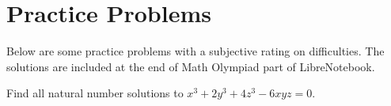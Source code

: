 \documentclass[../../main.tex]{subfiles}
\begin{document}
\section{Practice Problems}

Below are some practice problems with a subjective rating on
difficulties. The solutions are included at the end of Math Olympiad
part of LibreNotebook.

\begin{listproblem}
Find all natural number solutions to $x^3 + 2y^3 + 4z^3 - 6xyz = 0$.
\end{listproblem}
\end{document}
